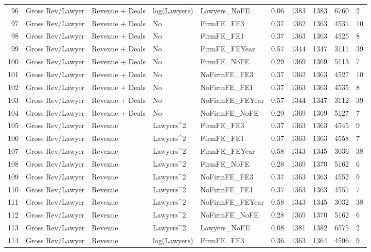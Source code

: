\begin{table}[ht]
\begin{tabular}{rlllllllll}
  96 & Gross Rev/Lawyer & Revenue + Deals & log(Lawyers) & Lawyers\_NoFE & 0.06 & 1383 & 1383 & 6760 & 2 \\ 
  97 & Gross Rev/Lawyer & Revenue + Deals & No & FirmFE\_FE3 & 0.37 & 1362 & 1363 & 4531 & 10 \\ 
  98 & Gross Rev/Lawyer & Revenue + Deals & No & FirmFE\_FE1 & 0.37 & 1363 & 1363 & 4525 & 8 \\ 
  99 & Gross Rev/Lawyer & Revenue + Deals & No & FirmFE\_FEYear & 0.57 & 1344 & 1347 & 3111 & 39 \\ 
  100 & Gross Rev/Lawyer & Revenue + Deals & No & FirmFE\_NoFE & 0.29 & 1369 & 1369 & 5113 & 7 \\ 
  101 & Gross Rev/Lawyer & Revenue + Deals & No & NoFirmFE\_FE3 & 0.37 & 1362 & 1363 & 4527 & 10 \\ 
  102 & Gross Rev/Lawyer & Revenue + Deals & No & NoFirmFE\_FE1 & 0.37 & 1363 & 1363 & 4535 & 8 \\ 
  103 & Gross Rev/Lawyer & Revenue + Deals & No & NoFirmFE\_FEYear & 0.57 & 1344 & 1347 & 3112 & 39 \\ 
  104 & Gross Rev/Lawyer & Revenue + Deals & No & NoFirmFE\_NoFE & 0.29 & 1369 & 1369 & 5127 & 7 \\ 
  105 & Gross Rev/Lawyer & Revenue & Lawyers^2 & FirmFE\_FE3 & 0.37 & 1363 & 1363 & 4545 & 9 \\ 
  106 & Gross Rev/Lawyer & Revenue & Lawyers^2 & FirmFE\_FE1 & 0.37 & 1363 & 1363 & 4558 & 7 \\ 
  107 & Gross Rev/Lawyer & Revenue & Lawyers^2 & FirmFE\_FEYear & 0.58 & 1343 & 1345 & 3036 & 38 \\ 
  108 & Gross Rev/Lawyer & Revenue & Lawyers^2 & FirmFE\_NoFE & 0.28 & 1369 & 1370 & 5162 & 6 \\ 
  109 & Gross Rev/Lawyer & Revenue & Lawyers^2 & NoFirmFE\_FE3 & 0.37 & 1363 & 1363 & 4552 & 9 \\ 
  110 & Gross Rev/Lawyer & Revenue & Lawyers^2 & NoFirmFE\_FE1 & 0.37 & 1363 & 1363 & 4551 & 7 \\ 
  111 & Gross Rev/Lawyer & Revenue & Lawyers^2 & NoFirmFE\_FEYear & 0.58 & 1343 & 1345 & 3032 & 38 \\ 
  112 & Gross Rev/Lawyer & Revenue & Lawyers^2 & NoFirmFE\_NoFE & 0.28 & 1369 & 1370 & 5162 & 6 \\ 
  113 & Gross Rev/Lawyer & Revenue & Lawyers^2 & Lawyers\_NoFE & 0.08 & 1381 & 1382 & 6575 & 2 \\ 
  114 & Gross Rev/Lawyer & Revenue & log(Lawyers) & FirmFE\_FE3 & 0.36 & 1363 & 1364 & 4596 & 9 \\ 

\end{tabular}
\end{table}
